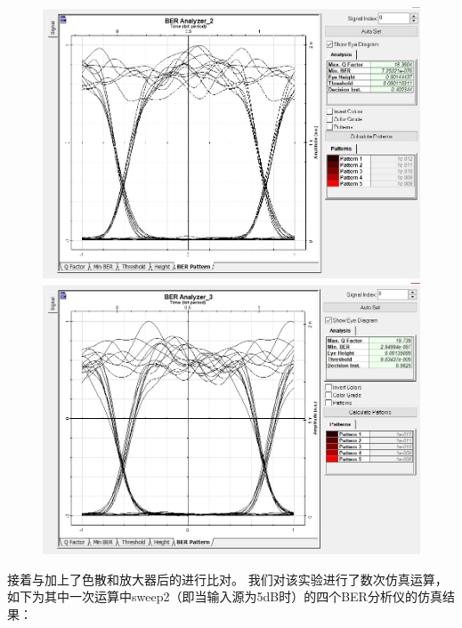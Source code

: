 \documentclass[12pt]{article}
\begin{document}
\begin{figure}[H]
\begin{minipage}[t]{0.5\linewidth}
        \includegraphics[scale=0.3]{3-BER.jpg}
        \caption{}
        \label{fig:side:a}
      \end{minipage}%
      \begin{minipage}[t]{0.5\linewidth}
        \centering
        \includegraphics[scale=0.3]{4-BER.jpg}
        \caption{}
        \label{fig:side:b}
      \end{minipage}
\end{figure}

接着与加上了色散和放大器后的进行比对。
我们对该实验进行了数次仿真运算，如下为其中一次运算中sweep2（即当输入源为5dB时）的四个BER分析仪的仿真结果：
\end{document}
